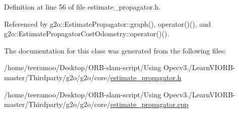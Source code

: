 Definition at line 56 of file estimate\+\_\+propagator.\+h.



Referenced by g2o\+::\+Estimate\+Propagator\+::graph(), operator()(), and g2o\+::\+Estimate\+Propagator\+Cost\+Odometry\+::operator()().



The documentation for this class was generated from the following files\+:\begin{DoxyCompactItemize}
\item 
/home/teeramoo/\+Desktop/\+O\+R\+B-\/slam-\/script/\+Using Opecv3./\+Learn\+V\+I\+O\+R\+B-\/master/\+Thirdparty/g2o/g2o/core/\hyperlink{estimate__propagator_8h}{estimate\+\_\+propagator.\+h}\item 
/home/teeramoo/\+Desktop/\+O\+R\+B-\/slam-\/script/\+Using Opecv3./\+Learn\+V\+I\+O\+R\+B-\/master/\+Thirdparty/g2o/g2o/core/\hyperlink{estimate__propagator_8cpp}{estimate\+\_\+propagator.\+cpp}\end{DoxyCompactItemize}
